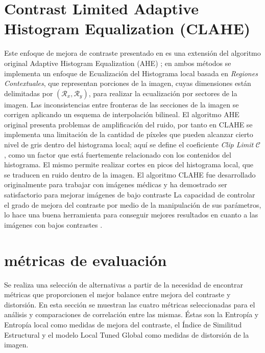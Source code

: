 \documentclass[spanish,twocolumn]{article}
\begin{document}
\section{Contrast Limited Adaptive Histogram Equalization (CLAHE)}
\label{sec:clahe}
Este enfoque de mejora de contraste presentado en \cite{Zuiderveld:1994:CLA:180895.180940} es una extensión del algoritmo original Adaptive Histogram Equalization (AHE) \cite{pizer1987adaptive}; en ambos métodos se implementa un enfoque de Ecualización del Histograma local basada en {\it Regiones Contextuales}, que representan porciones de la imagen, cuyas dimensiones están delimitadas por $(\mathcal{R}_x, \mathcal{R}_y)$, para realizar la ecualización por sectores de la imagen. Las inconsistencias entre fronteras de las secciones de la imagen se corrigen aplicando un esquema de interpolación bilineal. 
El algoritmo AHE original presenta problemas de amplificación del ruido, por tanto en CLAHE se implementa una limitación de la cantidad de píxeles que pueden alcanzar cierto nivel de gris dentro del histograma local; aquí se define el coeficiente {\it Clip Limit} $\mathcal{C}$, como un factor que está fuertemente relacionado con los contenidos del histograma. El mismo permite realizar cortes en picos del histograma local, que se traducen en ruido dentro de la imagen.
El algoritmo CLAHE fue desarrollado originalmente para trabajar con imágenes médicas y ha demostrado ser satisfactorio para mejorar imágenes de bajo contraste \cite{SMG11,MR13}
La capacidad de controlar el grado de mejora del contraste por medio de la manipulación de sus parámetros, lo hace una buena herramienta para conseguir mejores resultados en cuanto a las imágenes con bajos contrastes \cite{morebrizuela201}. 


\section{métricas de evaluación}
\label{sec:metricas}
Se realiza una selección de alternativas a partir de la necesidad de encontrar métricas que proporcionen el mejor balance entre mejora del contraste y distorsión. En esta sección se muestran las cuatro métricas seleccionadas para el análisis y comparaciones de correlación entre las mismas. Éstas son la Entropía y Entropía local como medidas de mejora del contraste, el Índice de Similitud Estructural y el modelo Local Tuned Global como medidas de distorsión de la imagen.
\end{document}
